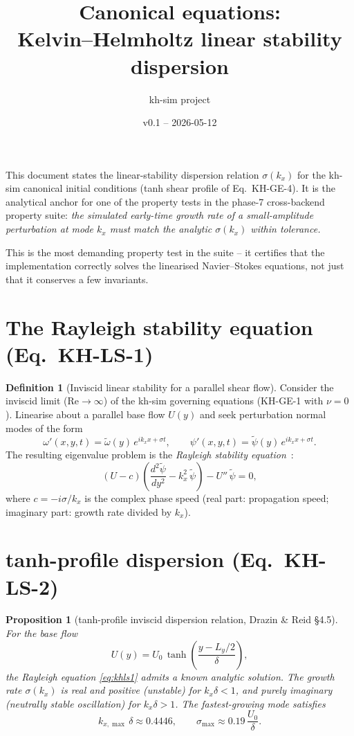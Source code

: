 \documentclass[11pt,a4paper]{article}
\title{Canonical equations:\\ Kelvin--Helmholtz linear stability dispersion}
\author{kh-sim project}
\date{v0.1 -- 2026-05-12}
\theoremstyle{definition}
\newtheorem{definition}{Definition}
\theoremstyle{plain}
\newtheorem{proposition}{Proposition}
\begin{document}
\maketitle

This document states the linear-stability dispersion relation
$\sigma(k_x)$ for the kh-sim canonical initial conditions
(tanh shear profile of Eq.\ KH-GE-4). It is the analytical anchor for
one of the property tests in the phase-7 cross-backend property suite:
\emph{the simulated early-time growth rate of a small-amplitude
perturbation at mode $k_x$ must match the analytic $\sigma(k_x)$
within tolerance.}

This is the most demanding property test in the suite -- it certifies
that the implementation correctly solves the linearised Navier--Stokes
equations, not just that it conserves a few invariants.

\section{The Rayleigh stability equation (Eq.\ KH-LS-1)}

\begin{definition}[Inviscid linear stability for a parallel shear flow]
Consider the inviscid limit ($\mathrm{Re} \to \infty$) of the kh-sim
governing equations (KH-GE-1 with $\nu = 0$). Linearise about a
parallel base flow $U(y)$ and seek perturbation normal modes of the
form
\[
\omega'(x, y, t) = \tilde\omega(y)\,e^{i k_x x + \sigma t},
\qquad
\psi'(x, y, t) = \tilde\psi(y)\,e^{i k_x x + \sigma t}.
\]
The resulting eigenvalue problem is the \emph{Rayleigh stability
equation}~\cite{DrazinReid2004}:
\begin{equation}
\label{eq:khls1}
(U - c)\left(\frac{d^2 \tilde\psi}{dy^2} - k_x^2\,\tilde\psi\right)
- U''\,\tilde\psi = 0,
\tag{KH-LS-1}
\end{equation}
where $c = -i\sigma / k_x$ is the complex phase speed (real part:
propagation speed; imaginary part: growth rate divided by $k_x$).
\end{definition}

\section{tanh-profile dispersion (Eq.\ KH-LS-2)}

\begin{proposition}[tanh-profile inviscid dispersion relation, Drazin \& Reid \S4.5]
For the base flow
\[
U(y) = U_0\,\tanh\!\left(\frac{y - L_y/2}{\delta}\right),
\]
the Rayleigh equation \eqref{eq:khls1} admits a known analytic
solution. The growth rate $\sigma(k_x)$ is real and positive
(\emph{unstable}) for $k_x \delta < 1$, and purely imaginary
(neutrally stable oscillation) for $k_x \delta > 1$. The
fastest-growing mode satisfies
\begin{equation}
\label{eq:khls2}
k_{x, \max}\,\delta \approx 0.4446,
\qquad
\sigma_{\max} \approx 0.19\,\frac{U_0}{\delta}.
\tag{KH-LS-2}
\end{equation}
\end{proposition}
\end{document}
